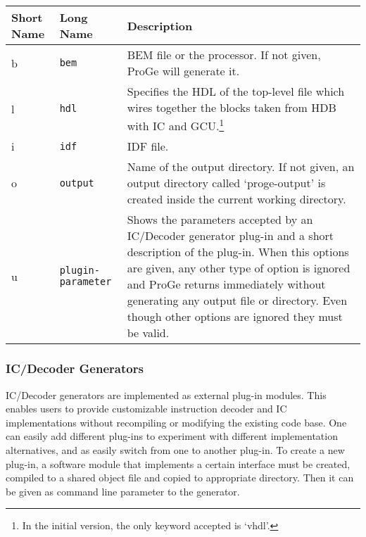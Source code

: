 \documentclass[twoside]{tceusermanual}
\begin{document}
\begin{center}
\begin{longtable}[htb]{@{}p{}@{}p{}%
                     @{}p{}}

\textbf{Short Name} &\textbf{Long Name} &\textbf{Description} \\
\hline

b & \verb|bem| &
BEM file or the processor. If not given, ProGe will generate it. \\

l & \verb|hdl| &
Specifies the HDL of the top-level file which wires together the blocks
taken from HDB with IC and GCU.\footnote{In the initial version, the only
keyword accepted is `vhdl'.} \\

i & \verb|idf| &
IDF file. \\

o & \verb|output| &%
Name of the output directory. If not given, an output directory called
`proge-output' is created inside the current working directory.
\\

u & \verb|plugin-parameter| &%
Shows the parameters accepted by an IC/Decoder generator plug-in and a short
description of the plug-in. When this options are given, any other type of
option is ignored and ProGe returns immediately without generating any output
file or directory.  Even though other options are ignored they must
be valid.
\\
\end{longtable}
\end{center}


\subsubsection{IC/Decoder Generators}

IC/Decoder generators are implemented as external plug-in
modules. This enables users to provide customizable instruction
decoder and IC implementations without recompiling or modifying the
existing code base. One can easily add different plug-ins to
experiment with different implementation alternatives, and as easily
switch from one to another plug-in. To create a new plug-in, a
software module that implements a certain interface must be created,
compiled to a shared object file and copied to appropriate
directory. Then it can be given as command line parameter to the
generator.
\end{document}
